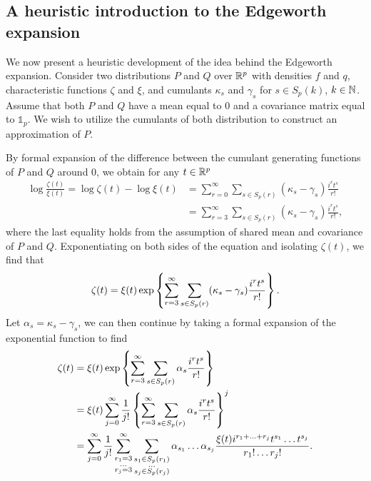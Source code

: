 \subsection{A heuristic introduction to the Edgeworth expansion}

We now present a heuristic development of the idea behind the Edgeworth expansion. Consider two distributions $P$ and $Q$ over ${\mathbb{R}^p}$ with densities $f$ and $q$, characteristic functions $\zeta$ and $\xi$, and cumulants $\kappa_s$ and $\gamma_s$ for $s \in S_p(k)$, $k \in \mathbb{N}$. Assume that both $P$ and $Q$ have a mean equal to $0$ and a covariance matrix equal to $\mathbb{1}_p$. We wish to utilize the cumulants of both distribution to construct an approximation of $P$.

By formal expansion of the difference between the cumulant generating functions of $P$ and $Q$ around 0, we obtain for any $t \in {\mathbb{R}^p}$
\begin{align*}
    \log \frac{\zeta(t)}{\xi(t)}
    = \log \zeta(t) - \log \xi(t) 
    &= \sum_{r=0}^\infty \sum_{s \in S_p(r)} (\kappa_s - \gamma_s)\frac{i^r t^s}{r!}\\
    &= \sum_{r=3}^\infty \sum_{s \in S_p(r)} (\kappa_s - \gamma_s)\frac{i^r t^s}{r!},
\end{align*}
where the last equality holds from the assumption of shared mean and covariance of $P$ and $Q$. Exponentiating on both sides of the equation and isolating $\zeta(t)$, we find that
\begin{equation*}
    \zeta(t) = \xi(t)\exp\left\{\sum_{r=3}^\infty \sum_{s \in S_p(r)} (\kappa_s - \gamma_s)\frac{i^r t^s}{r!}\right\}.
\end{equation*}
Let $\alpha_s = \kappa_s - \gamma_s$, we can then continue by taking a formal expansion of the exponential function to find
\begin{align*}
    \zeta(t)
    &= \xi(t)\exp\left\{\sum_{r=3}^\infty \sum_{s \in S_p(r)} \alpha_s\frac{i^r t^s}{r!}\right\}\\
    &= \xi(t)\sum_{j=0}^\infty \frac{1}{j!} \left\{\sum_{r=3}^\infty \sum_{s \in S_p(r)} \alpha_s\frac{i^r t^s}{r!}\right\}^j \\
    &=
    \sum_{j=0}^\infty \frac{1}{j!} 
    \sum_{\substack{r_1 = 3\\ \ldots \\r_j = 3}}^\infty
    \sum_{\substack{s_1 \in S_p(r_1)\\ \ldots \\s_j \in S_p(r_j)}}
    \alpha_{s_1}\ldots\alpha_{s_j}
    \frac{
        \xi(t) i^{r_1 + \ldots + r_j}
        t^{s_1} \ldots t^{s_j}
    }{
        r_1! \ldots r_j!
    }.
\end{align*}
